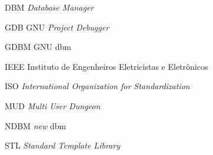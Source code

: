 \begin{siglas}
  \item[DBM] \textit{Database Manager}
  \item[GDB] GNU \textit{Project Debugger}
  \item[GDBM] GNU dbm
  \item[IEEE] Instituto de Engenheiros Eletricistas e Eletrônicos
  \item[ISO] \textit{International Organization for Standardization}
  \item[MUD] \textit{Multi User Dungeon}
  \item[NDBM] \textit{new} dbm 
  \item[STL] \textit{Standard Template Library} 
\end{siglas}
